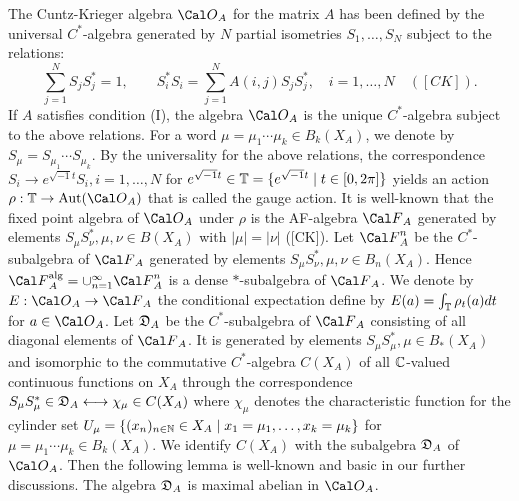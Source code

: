 The Cuntz-Krieger algebra $\OA$ for the matrix $A$ has been defined by 
the universal $C^*$-algebra generated by 
$N$ partial isometries $S_1,\dots, S_N$ subject to the relations:
$$ 
\sum_{j=1}^N S_j S_j^* = 1, \qquad
S_i^* S_i = \sum_{j=1}^N A(i,j) S_jS_j^*, \quad i=1,\dots,N \quad([CK]).
$$ 
If $A$ satisfies condition (I), 
the algebra $\OA$ is the unique $C^*$-algebra 
subject to the above relations.
For a word $\mu=\mu_1\cdots \mu_k \in B_k(X_A)$, we denote by 
$S_\mu = S_{\mu_1} \cdots S_{\mu_k}$.
By the universality for the above relations, 
the correspondence
$S_i \longrightarrow e^{\sqrt{-1}t}S_i, i=1,\dots,N$ 
for
$
e^{\sqrt{-1}t} \in 
{\Bbb T}=\{ e^{\sqrt{-1}t} \mid t \in [0,2 \pi]\}
$
yields an action 
$
\rho: {\Bbb T} \rightarrow \Aut(\OA)
$
that is called the gauge action.
It is well-known that the fixed point algebra of $\OA$ under $\rho$
is the AF-algebra $\FA$ generated by elements 
$S_\mu S_\nu^*, \mu, \nu \in B(X_A)$ 
with $|\mu | = |\nu|$ ([CK]). 
Let ${\Cal F}_A^n$ be the $C^*$-subalgebra of $\FA$
generated by elements $S_\mu S_\nu^*, \mu, \nu \in B_n(X_A)$.
Hence 
${\Cal F}_A^{\text{alg}} = \cup_{n=1}^{\infty}{\Cal F}_A^n$
is a dense $*$-subalgebra of $\FA$.  
We denote by $E: \OA \rightarrow \FA$
the conditional expectation define by
$E(a) = \int_{\Bbb T}\rho_t(a) dt $ for $a\in \OA$.
Let ${{\frak D}_A}$ be the $C^*$-subalgebra of $\FA$ consisting of all diagonal elements 
of $\FA$. 
It is generated by elements 
$S_\mu S_\mu^*, \mu \in B_*(X_A)$
and isomorphic to the commutative $C^*$-algebra 
$C(X_A)$ of all ${\Bbb C}$-valued continuous functions on 
$X_A$ through the correspondence
$ 
S_\mu S_\mu^* \in {{\frak D}_A} \longleftrightarrow \chi_\mu \in C(X_A)
$
where
$\chi_\mu$ denotes the characteristic function 
for the cylinder set 
$
U_\mu = \{ (x_n )_{n \in \Bbb N} \in X_A 
\mid x_1 =\mu_1,\dots, x_k = \mu_k \}
$
for $\mu=\mu_1\cdots\mu_k \in B_k(X_A)$.  
We identify $C(X_A)$ with the subalgebra 
${{\frak D}_A}$ of $\OA$.
Then the following lemma is well-known and basic in our further discussions.
The algebra ${{\frak D}_A}$ is maximal abelian in $\OA$.
\endproclaim

